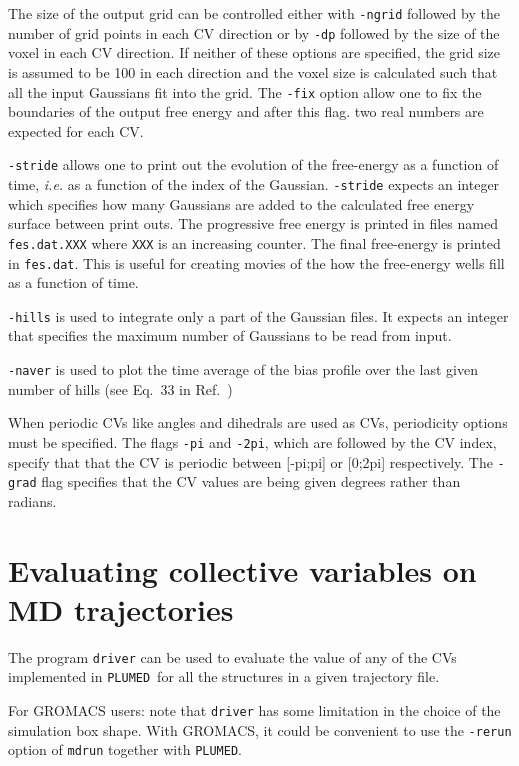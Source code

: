 \documentclass[12pt,fleqn]{report}
\newcommand{\plumed}{{\tt PLUMED}}
\begin{document}
The size of the output grid can be controlled either with {\tt -ngrid}
followed by the number of grid points in each CV direction
or by {\tt -dp} followed by the size of the voxel in each CV
direction. If neither of these options are specified, the grid
size is assumed to be 100 in each direction and the voxel size is
calculated such that all the input Gaussians fit into the grid. The {\tt -fix}
option allow one to fix the boundaries of the output free energy and after this flag. 
 two real numbers are expected for each CV.

{\tt -stride} allows one to print out the evolution of the free-energy as a
function of time, \emph{i.e.} as a function of the index of the Gaussian. 
{\tt -stride} expects an integer which specifies how many Gaussians
are added to the calculated free energy surface between print outs. The progressive free energy
is printed in files named {\tt fes.dat.XXX} where {\tt XXX} is an increasing
counter. The final free-energy is printed in {\tt fes.dat}.
This is useful for creating movies of the how the free-energy wells fill as a function of time.

{\tt -hills} is used to integrate only a part of the Gaussian files. It
expects an integer that specifies the maximum number of Gaussians to be read from input.

{\tt -naver} is used to plot the time average of the bias profile over the last given number of hills
(see Eq.~33 in Ref.~\cite{gerv-laio09review})

When periodic CVs like angles and dihedrals are used as CVs, periodicity options must be specified.
The flags {\tt -pi} and {\tt -2pi}, which are followed by the CV index, specify that
that the CV is periodic between [-pi;pi] or [0;2pi] respectively. The {\tt -grad} flag specifies that the CV values
are being given degrees rather than radians.

\section{Evaluating collective variables on MD trajectories}

The program {\tt driver} can be used to evaluate the value of any of the CVs
 implemented in \plumed \ for all the structures in a given trajectory file.

For GROMACS users: note that {\tt driver} has some limitation in the choice
of the simulation box shape. With GROMACS, it could be convenient to use
the {\tt -rerun} option of {\tt mdrun} together with \plumed.
\end{document}

